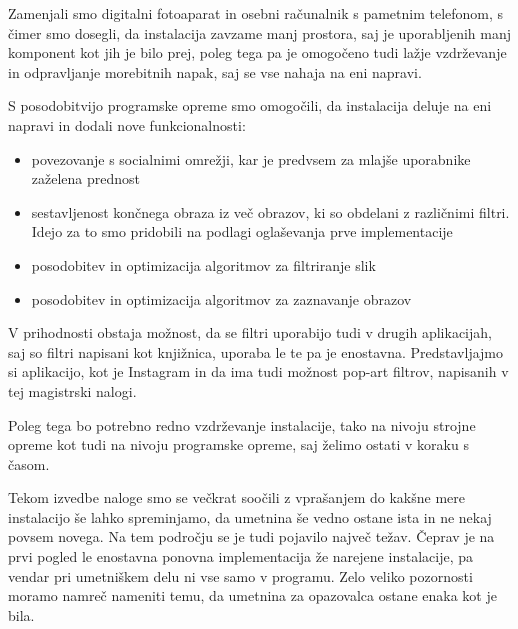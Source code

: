Zamenjali smo digitalni fotoaparat in osebni računalnik s pametnim telefonom,
s čimer smo dosegli, da instalacija zavzame manj prostora, saj je uporabljenih
manj komponent kot jih je bilo prej, poleg tega pa je omogočeno tudi lažje
vzdrževanje in odpravljanje morebitnih napak, saj se vse nahaja na eni
napravi.

S posodobitvijo programske opreme smo omogočili, da instalacija deluje na eni
napravi in dodali nove funkcionalnosti:
\begin{itemize}
	\item povezovanje s socialnimi omrežji, kar je predvsem za mlajše uporabnike zaželena prednost
	\item sestavljenost končnega obraza iz več obrazov, ki so obdelani z različnimi filtri. Idejo za to smo pridobili na podlagi oglaševanja prve implementacije
	\item posodobitev in optimizacija algoritmov za filtriranje slik
	\item posodobitev in optimizacija algoritmov za zaznavanje obrazov
\end{itemize}

V prihodnosti obstaja možnost, da se filtri uporabijo tudi v drugih
aplikacijah, saj so filtri napisani kot knjižnica, uporaba le te pa je
enostavna. Predstavljajmo si aplikacijo, kot je Instagram in da ima tudi
možnost pop-art filtrov, napisanih v tej magistrski nalogi.

Poleg tega bo potrebno redno vzdrževanje instalacije, tako na
nivoju strojne opreme kot tudi na nivoju programske opreme, saj želimo ostati
v koraku s časom.

Tekom izvedbe naloge smo se večkrat soočili z vprašanjem do kakšne mere
instalacijo še lahko spreminjamo, da umetnina še vedno ostane ista in ne nekaj
povsem novega. Na tem področju se je tudi pojavilo največ težav. Čeprav je na
prvi pogled le enostavna ponovna implementacija že narejene instalacije, pa
vendar pri umetniškem delu ni vse samo v programu. Zelo veliko pozornosti
moramo namreč nameniti temu, da umetnina za opazovalca ostane enaka kot je
bila.
